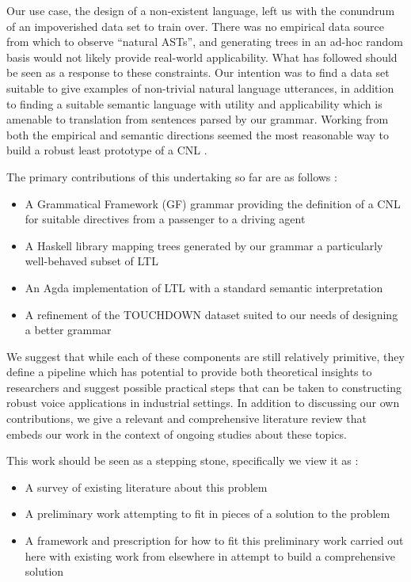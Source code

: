 \documentclass[a4paper, 11pt]{article}
\begin{document}
Our use case, the design of a non-existent language, left us with the conundrum
of an impoverished data set to train over. There was no empirical data source
from which to observe ``natural ASTs'', and generating trees in an ad-hoc random basis would
not likely provide real-world applicability. What has followed should be seen as
a response to these constraints. Our intention was to find a data set suitable
to give examples of non-trivial natural language utterances, in addition to
finding a suitable semantic language with utility and applicability which is
amenable to translation from sentences parsed by our grammar. Working from both
the empirical and semantic directions seemed the most reasonable way to build a
robust least prototype of a CNL .

The primary contributions of this undertaking so far are as follows :

\begin{itemize}[noitemsep]
\item A Grammatical Framework (GF) grammar providing the definition of a CNL for
suitable directives from a passenger to a driving agent
\item A Haskell library mapping trees generated by our grammar a particularly well-behaved subset of LTL
\item An Agda implementation of LTL with a standard semantic interpretation
\item A refinement of the TOUCHDOWN dataset \cite{chen2019touchdown} suited to our needs of designing a
better grammar
\end{itemize}

We suggest that while each of these components are still relatively primitive,
they define a pipeline which has potential to provide both theoretical insights
to researchers and suggest possible practical steps that can be taken to
constructing robust voice applications in industrial settings. In addition to
discussing our own contributions, we give a relevant and comprehensive literature
review that embeds our work in the context of ongoing studies about these
topics.

This work should be seen as a stepping stone, specifically we view it as :

\begin{itemize}[noitemsep]
\item A survey of existing literature about this problem 
\item A preliminary work attempting to fit in pieces of a solution to the problem  
\item A framework and prescription for how to fit this preliminary work carried
  out here with existing work from elsewhere in attempt to build a comprehensive solution
\end{itemize}
\end{document}
